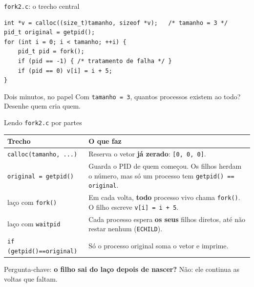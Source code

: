 \documentclass[aspectratio=169]{beamer}
\begin{document}
\begin{frame}[fragile]{\texttt{fork2.c}: o trecho central}
\begin{lstlisting}[style=codigo]
int *v = calloc((size_t)tamanho, sizeof *v);   /* tamanho = 3 */
pid_t original = getpid();
for (int i = 0; i < tamanho; ++i) {
    pid_t pid = fork();
    if (pid == -1) { /* tratamento de falha */ }
    if (pid == 0) v[i] = i + 5;
}
\end{lstlisting}

\vspace{0.5em}
\begin{alertblock}{Dois minutos, no papel}
Com \texttt{tamanho = 3}, quantos processos existem ao todo? Desenhe quem cria quem.
\end{alertblock}
\end{frame}

\begin{frame}{Lendo \texttt{fork2.c} por partes}
\small
\begin{center}
\begin{tabular}{@{}>{\raggedright\arraybackslash}p{4.9cm}>{\raggedright\arraybackslash}p{8.1cm}@{}}
\toprule
\textbf{Trecho} & \textbf{O que faz} \\
\midrule
\texttt{calloc(tamanho, ...)} & Reserva o vetor \textbf{já zerado}: \texttt{[0, 0, 0]}. \\
\texttt{original = getpid()} & Guarda o PID de quem começou. Os filhos herdam o número, mas só um processo tem \texttt{getpid() == original}. \\
laço com \texttt{fork()} & Em cada volta, \textbf{todo} processo vivo chama \texttt{fork()}. O filho escreve \texttt{v[i] = i + 5}. \\
laço com \texttt{waitpid} & Cada processo espera \textbf{os seus} filhos diretos, até não restar nenhum (\texttt{ECHILD}). \\
\texttt{if (getpid()==original)} & Só o processo original soma o vetor e imprime. \\
\bottomrule
\end{tabular}
\end{center}

\vspace{0.3em}
\centering Pergunta-chave: \textbf{o filho sai do laço depois de nascer?} Não: ele continua as voltas que faltam.
\end{frame}
\end{document}
